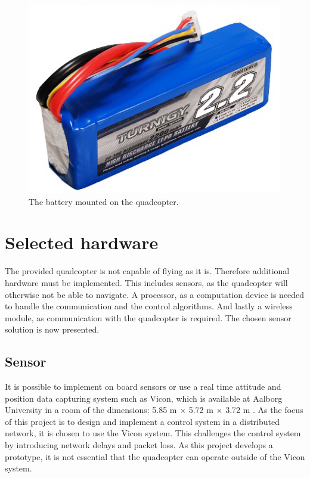 \begin{figure}[H]
	\centering
	\includegraphics[scale=0.5]{figures/BatteryPicturephoto}
	\caption{The battery mounted on the quadcopter.\cite{HKingBatterypicture}}
	\label{fig:battery}
\end{figure}
%

\section{Selected hardware}
The provided quadcopter is not capable of flying as it is. Therefore additional hardware must be implemented. This includes sensors, as the quadcopter will otherwise not be able to navigate. A processor, as a computation device is needed to handle the communication and the control algorithms. And lastly a wireless module, as communication with the quadcopter is required. The chosen sensor solution is now presented.

\subsection{Sensor}
It is possible to implement on board sensors or use a real time attitude and position data capturing system such as Vicon, which is available at Aalborg University in a room of the dimensions: 5.85 m $\times$ 5.72 m $\times$ 3.72 m .
As the focus of this project is to design and implement a control system in a distributed network, it is chosen to use the Vicon system. This challenges the control system by introducing network delays and packet loss. As this project develops a prototype, it is not essential that the quadcopter can operate outside of the Vicon system.

